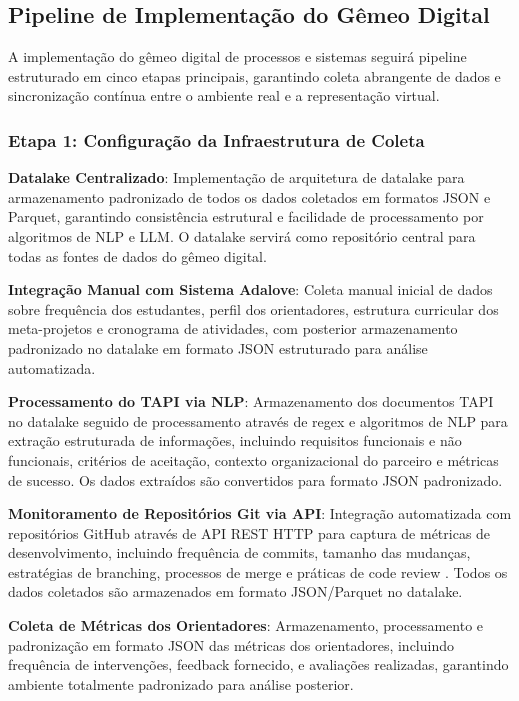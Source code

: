 \documentclass[12pt, a4paper, oneside, brazilian]{abntex2}
\begin{document}
\subsection{Pipeline de Implementação do Gêmeo Digital}

A implementação do gêmeo digital de processos e sistemas seguirá pipeline estruturado em cinco etapas principais, garantindo coleta abrangente de dados e sincronização contínua entre o ambiente real e a representação virtual.

\subsubsection{Etapa 1: Configuração da Infraestrutura de Coleta}

\textbf{Datalake Centralizado}: Implementação de arquitetura de datalake para armazenamento padronizado de todos os dados coletados em formatos JSON e Parquet, garantindo consistência estrutural e facilidade de processamento por algoritmos de NLP e LLM. O datalake servirá como repositório central para todas as fontes de dados do gêmeo digital.

\textbf{Integração Manual com Sistema Adalove}: Coleta manual inicial de dados sobre frequência dos estudantes, perfil dos orientadores, estrutura curricular dos meta-projetos e cronograma de atividades, com posterior armazenamento padronizado no datalake em formato JSON estruturado para análise automatizada.

\textbf{Processamento do TAPI via NLP}: Armazenamento dos documentos TAPI no datalake seguido de processamento através de regex e algoritmos de NLP para extração estruturada de informações, incluindo requisitos funcionais e não funcionais, critérios de aceitação, contexto organizacional do parceiro e métricas de sucesso. Os dados extraídos são convertidos para formato JSON padronizado.

\textbf{Monitoramento de Repositórios Git via API}: Integração automatizada com repositórios GitHub através de API REST HTTP \cite{kalliamvakou2014} para captura de métricas de desenvolvimento, incluindo frequência de commits, tamanho das mudanças, estratégias de branching, processos de merge e práticas de code review \cite{perezriverol2016}. Todos os dados coletados são armazenados em formato JSON/Parquet no datalake.

\textbf{Coleta de Métricas dos Orientadores}: Armazenamento, processamento e padronização em formato JSON das métricas dos orientadores, incluindo frequência de intervenções, feedback fornecido, e avaliações realizadas, garantindo ambiente totalmente padronizado para análise posterior.
\end{document}
